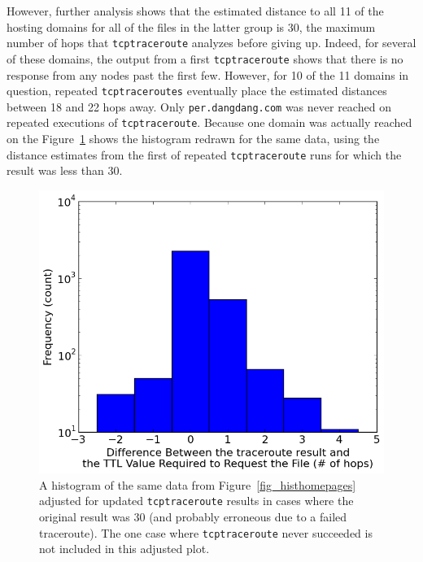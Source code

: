 However, further analysis shows that the estimated distance to all 11 of the hosting domains for all of the files in the latter group is 30, the maximum number of hops that \texttt{tcptraceroute} analyzes before giving up.
Indeed, for several of these domains, the output from a first \texttt{tcptraceroute} shows that there is no response from any nodes past the first few.
However, for 10 of the 11 domains in question, repeated \texttt{tcptraceroutes} eventually place the estimated distances between 18 and 22 hops away.
Only \texttt{per.dangdang.com} was never reached on repeated executions of \texttt{tcptraceroute}.
Because one domain was actually reached on the 
Figure~\ref{fig_histhomepages-mod} shows the histogram redrawn for the same data, using the distance estimates from the first of repeated \texttt{tcptraceroute} runs for which the result was less than 30.
\begin{figure}
	\includegraphics[width=\columnwidth]{figures/histhomepages-mod}
	\caption{
		A histogram of the same data from Figure~\ref{fig_histhomepages} adjusted for updated \texttt{tcptraceroute} results in cases where the original result was 30 (and probably erroneous due to a failed traceroute).
		The one case where \texttt{tcptraceroute} never succeeded is not included in this adjusted plot.
	}
	\label{fig_histhomepages-mod}
\end{figure}

